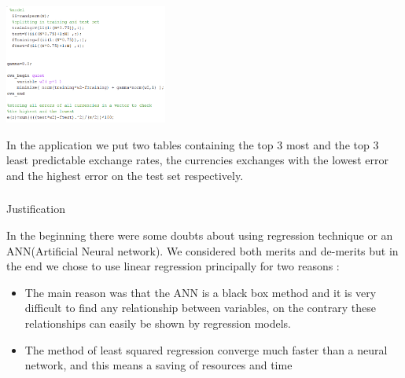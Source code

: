\includegraphics[width=0.4\textwidth]{error.png}

In the application we put two tables containing the top 3 most and the top 3 least predictable exchange rates, the currencies exchanges with the lowest error and the highest error on the test set respectively.


\subsubsection{}{Justification}

In the beginning there were some doubts about using regression technique or an ANN(Artificial Neural network)\cite{leung2000forecasting}.
We considered both merits and de-merits but in the end we chose to use linear regression principally for two reasons : 
\begin{itemize}
\item The main reason was that the ANN is a black box method and it is very difficult to find any relationship between variables, on the contrary these relationships can easily be shown by regression models. 
\item The method of least squared regression converge much faster than a neural network, and this means a saving of resources and time 
\end{itemize}

